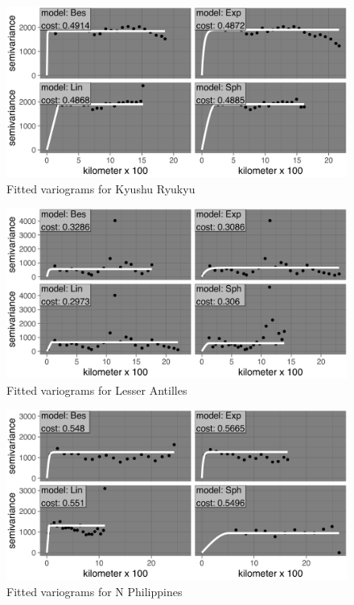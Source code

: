 \begin{figure}
\centering
\includegraphics{assets/figs/chpt3/KyushuRyukyuVgrms.png}
\caption[Fitted variograms for Kyushu Ryukyu]{Fitted variograms for Kyushu Ryukyu}
\end{figure}

\begin{figure}
\centering
\includegraphics{assets/figs/chpt3/LesserAntillesVgrms.png}
\caption[Fitted variograms for Lesser Antilles]{Fitted variograms for Lesser Antilles}
\end{figure}

\begin{figure}
\centering
\includegraphics{assets/figs/chpt3/NPhilippinesVgrms.png}
\caption[Fitted variograms for N Philippines]{Fitted variograms for N Philippines}
\end{figure}

